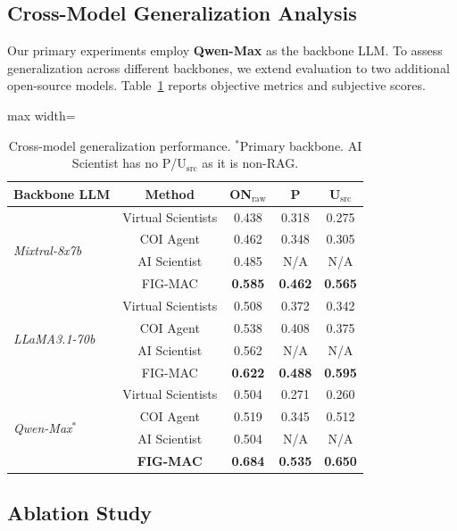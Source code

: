 \documentclass[runningheads]{llncs}
\begin{document}
\subsection{Cross-Model Generalization Analysis}
\label{sec:cross_model}

Our primary experiments employ \textbf{Qwen-Max} as the backbone LLM. To assess generalization across different backbones, we extend evaluation to two additional open-source models. Table~\ref{tab:cross_model} reports objective metrics and subjective scores.

\begin{table}[t]
\centering
\small
\caption{Cross-model generalization performance. $^*$Primary backbone. AI Scientist has no P/U$_{\text{src}}$ as it is non-RAG.}
\label{tab:cross_model}
\begin{adjustbox}{max width=\textwidth}
\begin{tabular}{lcccc}
\toprule
\textbf{Backbone LLM} & \textbf{Method} & \textbf{ON$_{\text{raw}}$} & \textbf{P} & \textbf{U$_{\text{src}}$} \\
\midrule
\multirow{4}{*}{\textit{Mixtral-8x7b}} 
 & Virtual Scientists & 0.438 & 0.318 & 0.275 \\
 & COI Agent & 0.462 & 0.348 & 0.305 \\
 & AI Scientist & 0.485 & N/A & N/A \\
 & FIG-MAC & \textbf{0.585} & \textbf{0.462} & \textbf{0.565} \\
\midrule
\multirow{4}{*}{\textit{LLaMA3.1-70b}} 
 & Virtual Scientists & 0.508 & 0.372 & 0.342 \\
 & COI Agent & 0.538 & 0.408 & 0.375 \\
 & AI Scientist & 0.562 & N/A & N/A \\
 & FIG-MAC & \textbf{0.622} & \textbf{0.488} & \textbf{0.595} \\
\midrule
\multirow{4}{*}{\textit{Qwen-Max}$^*$} 
 & Virtual Scientists & 0.504 & 0.271 & 0.260 \\
 & COI Agent & 0.519 & 0.345 & 0.512 \\
 & AI Scientist & 0.504 & N/A & N/A \\
 & \textbf{FIG-MAC} & \textbf{0.684} & \textbf{0.535} & \textbf{0.650} \\
\bottomrule
\end{tabular}
\end{adjustbox}
\end{table}

\subsection{Ablation Study}
\label{sec:ablation}
\end{document}
